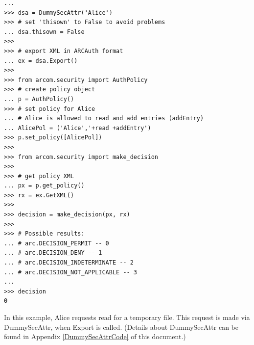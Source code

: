 \documentclass{article}
\begin{document}
\begin{flushleft}
\begin{itemize}
{\begin{example}
\begin{verbatim}
... 
>>> dsa = DummySecAttr('Alice')
>>> # set 'thisown' to False to avoid problems
... dsa.thisown = False
>>> 
>>> # export XML in ARCAuth format
... ex = dsa.Export()
>>> 
>>> from arcom.security import AuthPolicy
>>> # create policy object
... p = AuthPolicy()
>>> # set policy for Alice
... # Alice is allowed to read and add entries (addEntry)
... AlicePol = ('Alice','+read +addEntry')
>>> p.set_policy([AlicePol])
>>> 
>>> from arcom.security import make_decision
>>> 
>>> # get policy XML
... px = p.get_policy()
>>> rx = ex.GetXML()
>>> 
>>> decision = make_decision(px, rx)
>>> 
>>> # Possible results:
... # arc.DECISION_PERMIT -- 0
... # arc.DECISION_DENY -- 1
... # arc.DECISION_INDETERMINATE -- 2
... # arc.DECISION_NOT_APPLICABLE -- 3
... 
>>> decision
0
\end{verbatim}
      In this example, Alice requests read for a temporary file.
      This request is made via DummySecAttr, when Export is called.
      (Details about DummySecAttr can be found in Appendix \ref{DummySecAttrCode} of this document.)
    \end{example}
  }
\end{itemize}


\end{flushleft}
\end{document}
